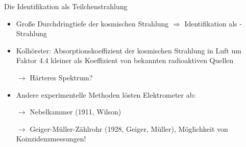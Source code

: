\documentclass[aspectratio=1610, professionalfonts, 9pt, hyperref={colorlinks=false}]{beamer}
\begin{document}
%  

\begin{frame}{Die Identifikation als Teilchenstrahlung}
      \begin{itemize}
        \setlength\itemsep{0.5em}
        \item Große Durchdringtiefe der kosmischen Strahlung $\Rightarrow$ Identifikation als \gamma-Strahlung
        \item Kolhörster: Absorptionskoeffizient der kosmischen Strahlung in Luft um Faktor \num{4.4} kleiner als Koeffizient von bekannten radioaktiven Quellen  
        \item [$\rightarrow$] Härteres Spektrum?
        \item Andere experimentelle Methoden lösten Elektrometer ab:
        \item [$\rightarrow$] Nebelkammer (1911, Wilson)
        \item [$\rightarrow$] Geiger-Müller-Zählrohr (1928, Geiger, Müller), Möglichkeit von Koinzidenzmessungen!
      \end{itemize}
\end{frame}
\end{document}
